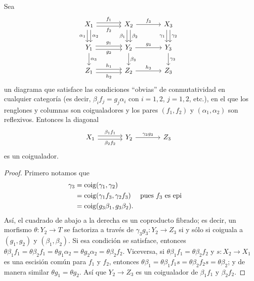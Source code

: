 \begin{lemma}[label=0.17]
  Sea
  \begin{equation*}
    \begin{tikzcd}[ampersand replacement = \&, column sep=large]
      X_1 \ar[shift left]{r}{f_1}\ar[shift right]{r}[swap]{f_2}
          \ar[shift left]{d}{\alpha_2}\ar[shift right]{d}[swap]{\alpha_1} \&
      X_2 \ar{r}{f_3}
          \ar[shift left]{d}{\beta_2}\ar[shift right]{d}[swap]{\beta_1} \&
      X_3 \ar[shift left]{d}{\gamma_2}\ar[shift right]{d}[swap]{\gamma_1} \\
      Y_1 \ar[shift left]{r}{g_1}\ar[shift right]{r}[swap]{g_2}
          \ar{d}{\alpha_3} \&
      Y_2 \ar{r}{g_3} \ar{d}{\beta_3} \&
      Y_3 \ar{d}{\gamma_3} \\
      Z_1 \ar[shift left]{r}{h_1}\ar[shift right]{r}[swap]{h_2} \&
      Z_2 \ar{r}{h_3} \& Z_3
    \end{tikzcd}
  \end{equation*}
  un diagrama que satisface las condiciones \enquote{obvias} de conmutatividad en
  cualquier categoría (es decir, \(\beta_i f_j = g_j \alpha_i\) con \(i=1,2\),
  \(j=1,2\), etc.), en el que los renglones y columnas son coigualadores y los
  pares \((f_1,f_2)\) y \((\alpha_1,\alpha_2)\) son reflexivos. Entonces la
  diagonal
  \begin{equation*}
    \begin{tikzcd}[ampersand replacement = \&, column sep=large]
      X_1 \ar[shift left]{r}{\beta_1 f_1}\ar[shift right]{r}[swap]{\beta_2 f_2} \&
      Y_2 \ar{r}{\gamma_3 g_3} \& Z_3
    \end{tikzcd}
  \end{equation*}
  es un coigualador.
\end{lemma}
\begin{proof}
  Primero notamos que
  \begin{align*}
    \gamma_3 & = \operatorname{coig}(\gamma_1, \gamma_2)\\
             & = \operatorname{coig}(\gamma_1 f_3, \gamma_2 f_3) && \text{pues \(f_3\) es epi}\\
             & = \operatorname{coig}(g_3 \beta_1, g_3 \beta_2).
  \end{align*}
  Así, el cuadrado de abajo a la derecha es un coproducto fibrado; es decir, un
  morfismo \(\theta\colon Y_2\to T\) se factoriza a través de 
  \(\gamma_3 g_3\colon Y_2\to Z_3\) si y sólo si coiguala a \((g_1, g_2)\) y
  \((\beta_1,\beta_2)\). Si esa condición se satisface, entonces
  \(\theta\beta_1f_1=\theta\beta_2f_1=\theta g_1\alpha_2=\theta g_2\alpha_2
  =\theta\beta_2f_2\). Viceversa, si \(\theta\beta_1f_1=\theta\beta_2f_2\) y 
  \(s\colon X_2\to X_1\) es una escisión común para \(f_1\) y \(f_2\), entonces
  \(\theta\beta_1=\theta\beta_1f_1s=\theta\beta_2f_2s=\theta\beta_2\); y de
  manera similar \(\theta g_1=\theta g_2\). Así que \(Y_2\to Z_3\) es un
  coigualador de \(\beta_1 f_1\) y \(\beta_2 f_2\).
\end{proof}

